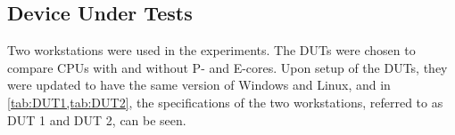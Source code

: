 
\subsection{Device Under Tests}

Two workstations were used in the experiments. The DUTs were chosen to compare CPUs with and without P- and E-cores. Upon setup of the DUTs, they were updated to have the same version of Windows and Linux, and in \cref {tab:DUT1,tab:DUT2}, the specifications of the two workstations, referred to as DUT 1 and DUT 2, can be seen. 





